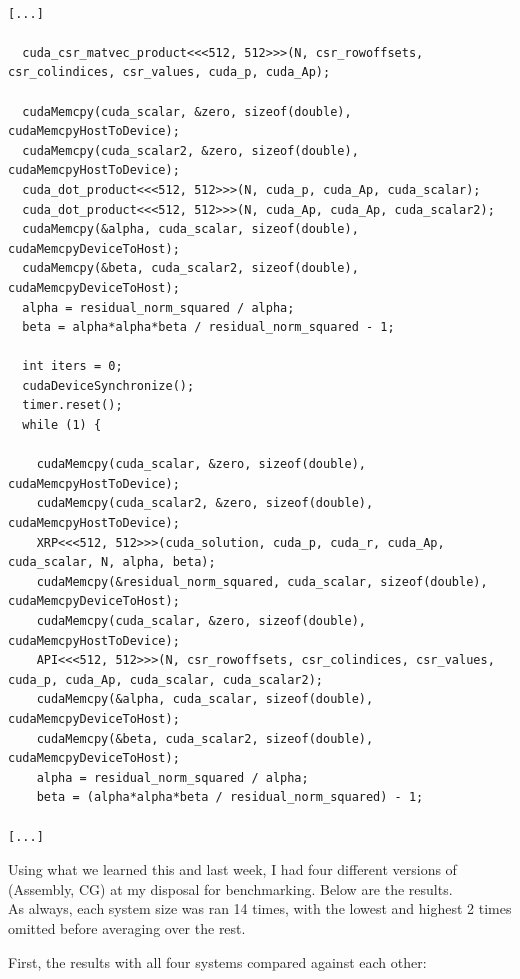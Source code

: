 \documentclass[11pt]{article}
\begin{document}
\begin{small}
\begin{verbatim}

[...]

  cuda_csr_matvec_product<<<512, 512>>>(N, csr_rowoffsets, csr_colindices, csr_values, cuda_p, cuda_Ap);

  cudaMemcpy(cuda_scalar, &zero, sizeof(double), cudaMemcpyHostToDevice);
  cudaMemcpy(cuda_scalar2, &zero, sizeof(double), cudaMemcpyHostToDevice);
  cuda_dot_product<<<512, 512>>>(N, cuda_p, cuda_Ap, cuda_scalar);
  cuda_dot_product<<<512, 512>>>(N, cuda_Ap, cuda_Ap, cuda_scalar2);
  cudaMemcpy(&alpha, cuda_scalar, sizeof(double), cudaMemcpyDeviceToHost);
  cudaMemcpy(&beta, cuda_scalar2, sizeof(double), cudaMemcpyDeviceToHost);
  alpha = residual_norm_squared / alpha;
  beta = alpha*alpha*beta / residual_norm_squared - 1;

  int iters = 0;
  cudaDeviceSynchronize();
  timer.reset();
  while (1) {

    cudaMemcpy(cuda_scalar, &zero, sizeof(double), cudaMemcpyHostToDevice);
    cudaMemcpy(cuda_scalar2, &zero, sizeof(double), cudaMemcpyHostToDevice);
    XRP<<<512, 512>>>(cuda_solution, cuda_p, cuda_r, cuda_Ap, cuda_scalar, N, alpha, beta);
    cudaMemcpy(&residual_norm_squared, cuda_scalar, sizeof(double), cudaMemcpyDeviceToHost);
    cudaMemcpy(cuda_scalar, &zero, sizeof(double), cudaMemcpyHostToDevice);
    API<<<512, 512>>>(N, csr_rowoffsets, csr_colindices, csr_values, cuda_p, cuda_Ap, cuda_scalar, cuda_scalar2);
    cudaMemcpy(&alpha, cuda_scalar, sizeof(double), cudaMemcpyDeviceToHost);
    cudaMemcpy(&beta, cuda_scalar2, sizeof(double), cudaMemcpyDeviceToHost);
    alpha = residual_norm_squared / alpha;
    beta = (alpha*alpha*beta / residual_norm_squared) - 1;

[...]

\end{verbatim}
\end{small}
\pagebreak

Using what we learned this and last week, I had four different versions of (Assembly, CG) at my disposal for benchmarking. Below are the results.
\\
As always, each system size was ran 14 times, with the lowest and highest 2 times omitted before averaging over the rest.

First, the results with all four systems compared against each other:
\end{document}
